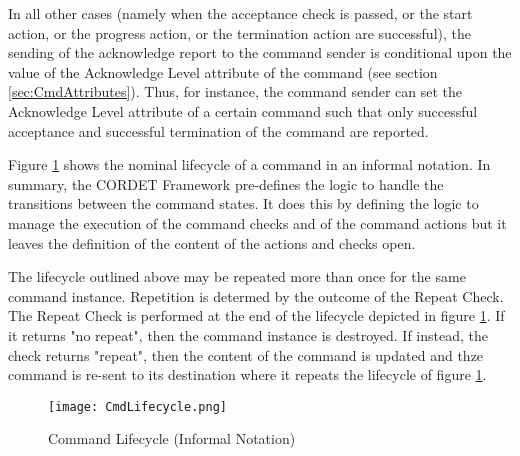 In all other cases (namely when the acceptance check is passed, or the start action, or the progress action, or the termination action are successful), the sending of the acknowledge report to the command sender is conditional upon the value of the Acknowledge Level attribute of the command (see section \ref{sec:CmdAttributes}). Thus, for instance, the command sender can set the Acknowledge Level attribute of a certain command such that only successful acceptance and successful termination of the command are reported. 

Figure \ref{fig:CmdLifecycle} shows the nominal lifecycle of a command in an informal notation. In summary, the CORDET Framework pre-defines the logic to handle the transitions between the command states. It does this by defining the logic to manage the execution of the command checks and of the command actions but it leaves the definition of the content of the actions and checks open. 

The lifecycle outlined above may be repeated more than once for the same command instance. Repetition is determed by the outcome of the Repeat Check. The Repeat Check is performed at the end of the lifecycle depicted in figure \ref{fig:CmdLifecycle}. If it returns "no repeat", then the command instance is destroyed. If instead, the check returns "repeat", then the content of the command is updated and thze command is re-sent to its destination where it repeats the lifecycle of figure \ref{fig:CmdLifecycle}.

\begin{figure}[ht]
 \centering
 \texttt{[image: CmdLifecycle.png]}
 \caption{Command Lifecycle (Informal Notation)}
 \label{fig:CmdLifecycle}
\end{figure}


